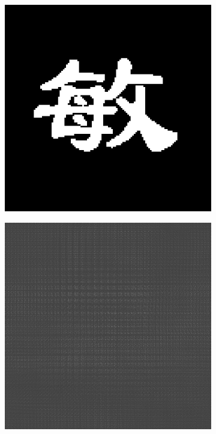 \documentclass{ctexart}
\begin{document}
\begin{figure}[H]
  \centering
  \begin{subfigure}{.32\textwidth}
    \includegraphics[width=\linewidth]{数字全息实验数据/计算机模拟全息/全息样品图片/5-敏.jpg}
  \end{subfigure}
  \begin{subfigure}{.32\textwidth}
    \includegraphics[width=\linewidth]{数字全息实验数据/计算机模拟全息/用软件模拟得到的全息图/5-敏-全息图.jpg}

\end{subfigure}
\end{figure}
\end{document}
